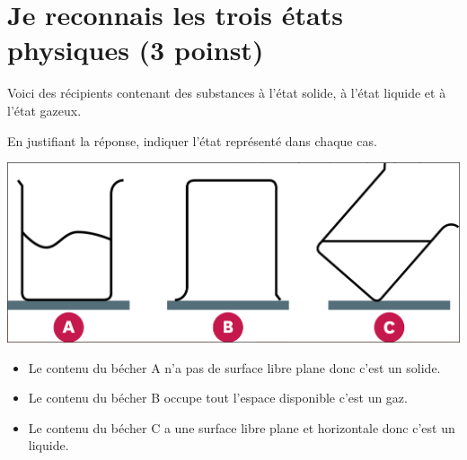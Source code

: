 \section{Je reconnais les trois états physiques (3 poinst)}

Voici des récipients contenant des substances à l'état solide, à l'état liquide et à l'état gazeux.

\begin{questions}
	\question[3] En justifiant la réponse, indiquer l'état représenté dans chaque cas.
		
		\begin{center}
			\includegraphics[scale=0.4]{img/reco1}
		\end{center}
	
	\begin{solution}
		\begin{itemize}
			\item Le contenu du bécher A n'a pas de surface libre plane donc c'est un solide.
			
			\item Le contenu du bécher B occupe tout l'espace disponible c'est un gaz.
			
			\item Le contenu du bécher C a une surface libre plane et horizontale donc c'est un liquide.
		\end{itemize}
	\end{solution}


%				
%				

\end{questions}